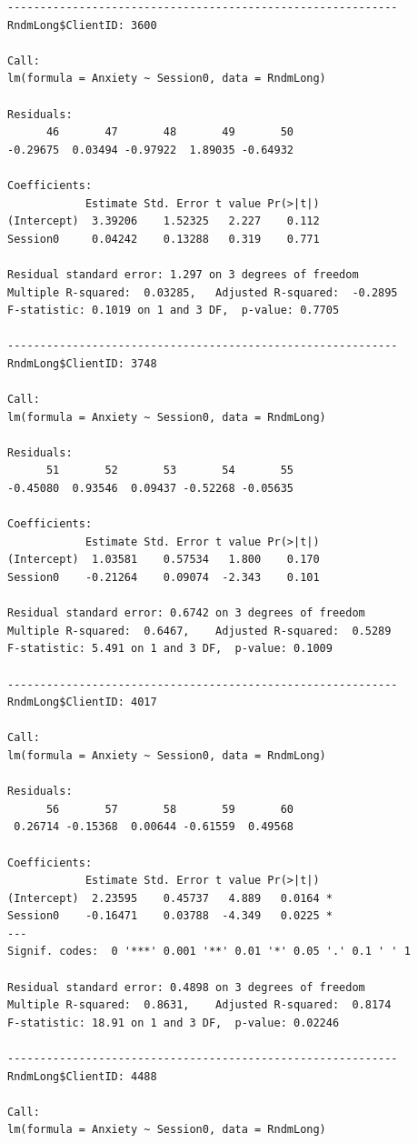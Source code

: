 \documentclass[
  english,
]{book}
\begin{document}
\begin{verbatim}
------------------------------------------------------------ 
RndmLong$ClientID: 3600

Call:
lm(formula = Anxiety ~ Session0, data = RndmLong)

Residuals:
      46       47       48       49       50 
-0.29675  0.03494 -0.97922  1.89035 -0.64932 

Coefficients:
            Estimate Std. Error t value Pr(>|t|)
(Intercept)  3.39206    1.52325   2.227    0.112
Session0     0.04242    0.13288   0.319    0.771

Residual standard error: 1.297 on 3 degrees of freedom
Multiple R-squared:  0.03285,   Adjusted R-squared:  -0.2895 
F-statistic: 0.1019 on 1 and 3 DF,  p-value: 0.7705

------------------------------------------------------------ 
RndmLong$ClientID: 3748

Call:
lm(formula = Anxiety ~ Session0, data = RndmLong)

Residuals:
      51       52       53       54       55 
-0.45080  0.93546  0.09437 -0.52268 -0.05635 

Coefficients:
            Estimate Std. Error t value Pr(>|t|)
(Intercept)  1.03581    0.57534   1.800    0.170
Session0    -0.21264    0.09074  -2.343    0.101

Residual standard error: 0.6742 on 3 degrees of freedom
Multiple R-squared:  0.6467,    Adjusted R-squared:  0.5289 
F-statistic: 5.491 on 1 and 3 DF,  p-value: 0.1009

------------------------------------------------------------ 
RndmLong$ClientID: 4017

Call:
lm(formula = Anxiety ~ Session0, data = RndmLong)

Residuals:
      56       57       58       59       60 
 0.26714 -0.15368  0.00644 -0.61559  0.49568 

Coefficients:
            Estimate Std. Error t value Pr(>|t|)  
(Intercept)  2.23595    0.45737   4.889   0.0164 *
Session0    -0.16471    0.03788  -4.349   0.0225 *
---
Signif. codes:  0 '***' 0.001 '**' 0.01 '*' 0.05 '.' 0.1 ' ' 1

Residual standard error: 0.4898 on 3 degrees of freedom
Multiple R-squared:  0.8631,    Adjusted R-squared:  0.8174 
F-statistic: 18.91 on 1 and 3 DF,  p-value: 0.02246

------------------------------------------------------------ 
RndmLong$ClientID: 4488

Call:
lm(formula = Anxiety ~ Session0, data = RndmLong)


\end{verbatim}
\end{document}
